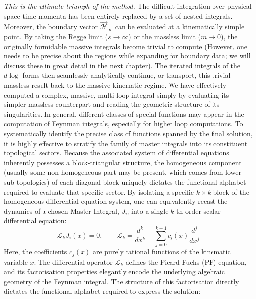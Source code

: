 \textit{This is the ultimate triumph of the method.} The difficult integration over physical space-time momenta has been entirely replaced by a set of nested integrals. Moreover, the boundary vector $\vec{\mathcal{H}}_\infty$ can be evaluated at a kinematically simple point. By taking the Regge limit ($s \to \infty$) or the massless limit ($m \to 0$), the originally formidable massive integrals become trivial to compute (However, one needs to be precise about the regions while expanding  for boundary data; we will discuss these in great detail in the next chapter). The iterated integrals of the $d\log$ forms then seamlessly analytically continue, or transport, this trivial massless result back to the massive kinematic regime. We have effectively computed a complex, massive, multi-loop integral simply by evaluating its simpler massless counterpart and reading the geometric structure of its singularities. In general, different classes of special functions may appear in the computation of Feynman integrals, especially for higher loop computations. To systematically identify the precise class of functions spanned by the final solution, it is highly effective to stratify the family of master integrals into its constituent topological sectors. Because the associated system of differential equations inherently possesses a block-triangular structure, the homogeneous component (usually some non-homogeneous part may be present, which comes from lower sub-topologies) of each diagonal block uniquely dictates the functional alphabet required to evaluate that specific sector. By isolating a specific $k \times k$  block of the homogeneous differential equation system, one can equivalently recast the dynamics of a chosen Master Integral, $J_i$, into a single $k$-th order scalar differential equation:
\begin{equation}
    \mathcal{L}_k J_i(x) = 0, \qquad \mathcal{L}_{k} = \frac{d^k}{dx^k} + \sum_{j=0}^{k-1} c_j(x)\frac{d^j}{dx^j}
\end{equation}
Here, the coefficients $c_j(x)$ are purely rational functions of the kinematic variable $x$. The differential operator $\mathcal{L}_k$ defines the Picard-Fuchs (PF) equation, and its factorisation properties elegantly encode the underlying algebraic geometry of the Feynman integral. 
The structure of this factorisation directly dictates the functional alphabet required to express the solution:
\begingroup
\setlength{\tabcolsep}{0pt}
\renewcommand{\arraystretch}{1.5} %
